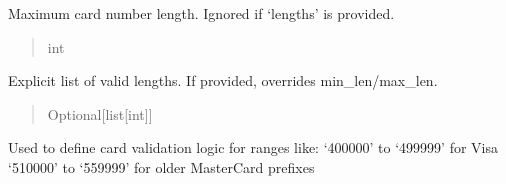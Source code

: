 \documentclass[letterpaper,10pt,english]{sphinxmanual}
\begin{document}
\begin{fulllineitems}
\begin{fulllineitems}
\begin{fulllineitems}
\label{\detokenize{apache_commons_validator_python.routines:apache_commons_validator_python.routines.credit_card_validator.CreditCardValidator.CreditCardRange.max_len}}
\pysigstartsignatures
{}
\pysigstopsignatures
\sphinxAtStartPar
Maximum card number length. Ignored if ‘lengths’ is provided.
\begin{quote}\begin{description}
\sphinxAtStartPar
int

\end{description}\end{quote}

\end{fulllineitems}


\begin{fulllineitems}
\label{\detokenize{apache_commons_validator_python.routines:apache_commons_validator_python.routines.credit_card_validator.CreditCardValidator.CreditCardRange.lengths}}
\pysigstartsignatures
{}
\pysigstopsignatures
\sphinxAtStartPar
Explicit list of valid lengths. If provided, overrides min\_len/max\_len.
\begin{quote}\begin{description}
\sphinxAtStartPar
Optional{[}list{[}int{]}{]}

\end{description}\end{quote}

\end{fulllineitems}


\sphinxAtStartPar
Used to define card validation logic for ranges like:
\sphinxhyphen{} ‘400000’ to ‘499999’ for Visa
\sphinxhyphen{} ‘510000’ to ‘559999’ for older MasterCard prefixes

\end{fulllineitems}



\end{fulllineitems}
\end{document}
